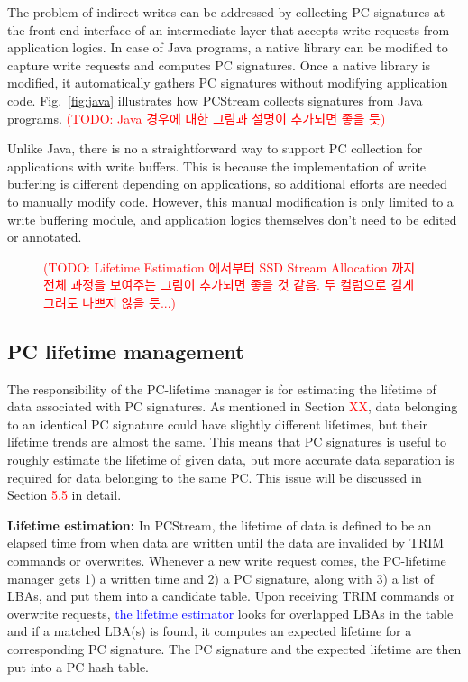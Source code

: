 The problem of indirect writes can be addressed by collecting PC signatures at
the front-end interface of an intermediate layer that accepts write requests
from application logics. In case of Java programs, a native library can be
modified to capture write requests and computes PC signatures. Once a native
library is modified, it automatically gathers PC signatures without modifying
application code. Fig.~\ref{fig:java} illustrates how \textsf{PCStream}
collects signatures from Java programs.  \textcolor{red}{(TODO: Java 경우에
대한 그림과 설명이 추가되면 좋을 듯)}

Unlike Java, there is no a straightforward way to support PC collection for
applications with write buffers. This is because the implementation of write
buffering is different depending on applications, so additional efforts are
needed to manually modify code. However, this manual modification is only
limited to a write buffering module, and application logics themselves don't
need to be edited or annotated.



\begin{figure}[t]
\centering
\begin{pgfpicture}
\end{pgfpicture}
\caption{\textcolor{red}{(TODO: Lifetime Estimation 에서부터 SSD Stream Allocation 까지 전체 과정을 
보여주는 그림이 추가되면 좋을 것 같음. 두 컬럼으로 길게 그려도 나쁘지 않을 듯...)}}
\label{fig:process}
\end{figure}

\subsection{PC lifetime management}
The responsibility of the PC-lifetime manager is for estimating the lifetime of
data associated with PC signatures. As mentioned in Section
\textcolor{red}{XX}, data belonging to an identical PC signature could have
slightly different lifetimes, but their lifetime trends are almost the same.
This means that PC signatures is useful to roughly estimate the lifetime of
given data, but more accurate data separation is required for data belonging to
the same PC.  This issue will be discussed in Section \textcolor{red}{5.5} in
detail.

\textbf{Lifetime estimation:}
In \textsf{PCStream}, the lifetime of data is defined to be an elapsed time
from when data are written until the data are invalided by TRIM commands or
overwrites. Whenever a new write request comes, the PC-lifetime manager gets 1)
a written time and 2) a PC signature, along with 3) a list of LBAs, and put
them into a candidate table. Upon receiving TRIM commands or overwrite
requests, \textcolor{blue}{the lifetime estimator} looks for overlapped LBAs in
the table and if a matched LBA(s) is found, it computes an expected lifetime
for a corresponding PC signature. The PC signature and the expected lifetime
are then put into a PC hash table.

